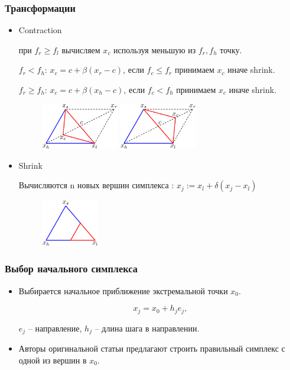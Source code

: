\begin{frame}
  \frametitle{Трансформации}
  \begin{itemize}
     \item Contraction

    при $f_r \geq f_l$ вычисляем $x_c$ используя меньшую из $f_r, f_h$ точку.

    $f_r < f_h$: $x_c = c + \beta(x_r - c)$, если  $f_c \leq f_r$ принимаем $x_c$ иначе shrink.

    $f_r \geq f_h$: $x_c = c + \beta(x_h - c)$, если  $f_c < f_h$ принимаем $x_c$ иначе shrink.

  \begin{figure}
    \begin{minipage}{0.4\textwidth}
      \centering
      \includegraphics[height=2cm]{figures/contraction2.jpg}
    \end{minipage}
    \begin{minipage}{0.4\textwidth}
      \centering
      \includegraphics[height=2cm]{figures/contraction1.jpg}
    \end{minipage}
  \end{figure}
  \item Shrink

  Вычисляются n новых вершин симплекса : $x_j := x_l + \delta (x_j - x_l)$
       \begin{figure}
      \includegraphics[height=2cm]{figures/shrink.jpg}
      \end{figure}
  
  \end{itemize}
\end{frame}


\begin{frame}
  \frametitle{Выбор начального симплекса}
  \begin{itemize}
    \item Выбирается начальное приближение экстремальной точки $x_0$.

    \begin{equation*}
      x_j = x_0 + h_j e_j,
    \end{equation*}

  $e_j$ -- направление, $h_j$ -- длина шага в направлении.


  \item Авторы оригинальной статьи предлагают строить правильный симплекс с одной из вершин в $x_0$.
\end{itemize}
\end{frame}
